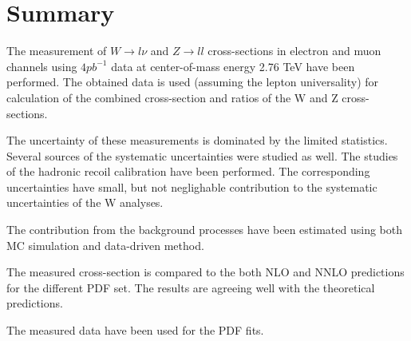 \chapter{Summary}
The measurement of $W\to l\nu$ and $Z\to ll$ cross-sections in electron and muon channels using $4 pb^{-1}$ \atlas data at center-of-mass energy 2.76 TeV have been performed. The obtained data is used (assuming the lepton universality) for calculation of the combined cross-section and ratios of the W and Z cross-sections.

The uncertainty of these measurements is dominated by the limited statistics. Several sources of the systematic uncertainties were studied as well. The studies of the hadronic recoil calibration have been performed. The corresponding uncertainties have small, but not neglighable contribution to the systematic uncertainties of the W analyses. 

The contribution from the background processes have been estimated using both MC simulation and data-driven method.

The measured cross-section is compared to the both NLO and NNLO predictions for the different PDF set. The results are agreeing well with the theoretical predictions.

The measured data have been used for the PDF fits.


